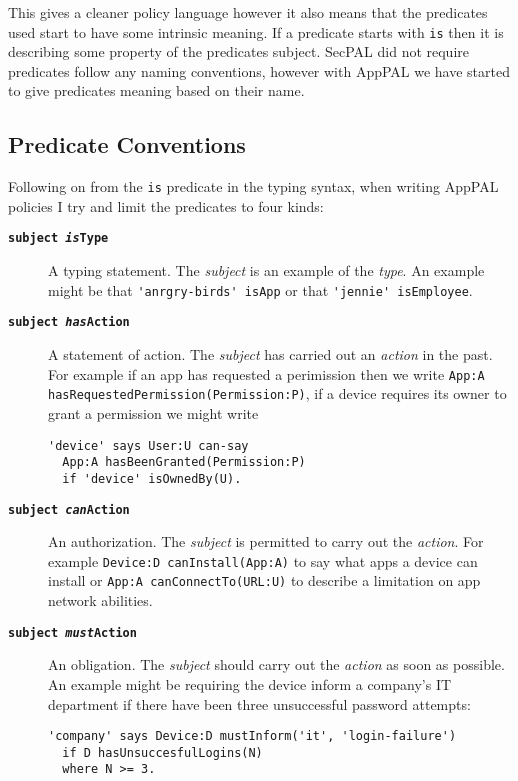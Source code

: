 \documentclass[thesis.tex]{subfiles}
\begin{document}
This gives a cleaner policy language however it also means that the predicates
used start to have some intrinsic meaning.  If a predicate starts with
\texttt{is} then it is describing some property of the predicates subject.
SecPAL did not require predicates follow any naming conventions, however with
AppPAL we have started to give predicates meaning based on their name.

\subsection{Predicate Conventions}

Following on from the \texttt{is} predicate in the typing syntax, when writing
AppPAL policies I try and limit the predicates to four kinds:
\begin{description}
\item[\bfseries\texttt{subject \emph{is}Type}]
  A typing statement.  The \emph{subject} is an example of the \emph{type}.  An
  example might be that \lstinline!'anrgry-birds' isApp! or that
  \lstinline!'jennie' isEmployee!.
\item[\bfseries\texttt{subject \emph{has}Action}]
  A statement of action.  The \emph{subject} has carried out an \emph{action} in
  the past. For example if an app has requested a perimission then we write
  \lstinline!App:A hasRequestedPermission(Permission:P)!, if a device requires
  its owner to grant a permission we might write
\begin{lstlisting}
'device' says User:U can-say 
  App:A hasBeenGranted(Permission:P)
  if 'device' isOwnedBy(U).
\end{lstlisting}
\item[\bfseries\texttt{subject \emph{can}Action}]
  An authorization. The \emph{subject} is permitted to carry out the \emph{action}.
  For example \lstinline!Device:D canInstall(App:A)! to say what apps a device
  can install or \lstinline!App:A canConnectTo(URL:U)! to describe a limitation
  on app network abilities.
\item[\bfseries\texttt{subject \emph{must}Action}]
  An obligation.  The \emph{subject} should carry out the \emph{action} as soon
  as possible.
  An example might be requiring the device inform a company's IT department if
  there have been three unsuccessful password attempts:
\begin{lstlisting}
'company' says Device:D mustInform('it', 'login-failure')
  if D hasUnsuccesfulLogins(N)
  where N >= 3.
\end{lstlisting}
\end{description}
\end{document}
